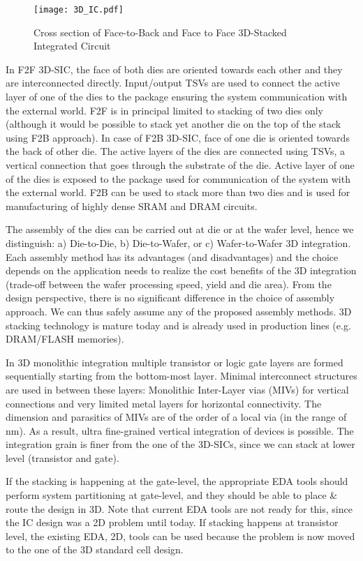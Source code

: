 \begin{figure}[!b]%
\centering
\texttt{[image: 3D\_IC.pdf]}
\caption{Cross section of Face-to-Back and Face to Face 3D-Stacked Integrated Circuit\label{fig:3D-Stacking}}
\end{figure}

In F2F 3D-SIC, the face of both dies are oriented towards each other and they are interconnected directly. Input/output TSVs are used to connect the active layer of one of the dies to the package ensuring the system communication with the external world. F2F is in principal limited to stacking of two dies only (although it would be possible to stack yet another die on the top of the stack using F2B approach). In case of F2B 3D-SIC, face of one die is oriented towards the back of other die. The active layers of the dies are connected using TSVs, a vertical connection that goes through the substrate of the die. Active layer of one of the dies is exposed to the package used for communication of the system with the external world. F2B can be used to stack more than two dies and is used for manufacturing of highly dense SRAM and DRAM circuits.

The assembly of the dies can be carried out at die or at the wafer level, hence we distinguish: a) Die-to-Die, b) Die-to-Wafer, or c) Wafer-to-Wafer 3D integration. Each assembly method has its advantages (and disadvantages) and the choice depends on the application needs to realize the cost benefits of the 3D integration (trade-off between the wafer processing speed, yield and die area). From the design perspective, there is no significant difference in the choice of assembly approach. We can thus safely assume any of the proposed assembly methods. 3D stacking technology is mature today and is already used in production lines (e.g. DRAM/FLASH memories).

In 3D monolithic integration multiple transistor or logic gate layers are formed sequentially starting from the bottom-most layer. Minimal interconnect structures are used in between these layers: Monolithic Inter-Layer vias (MIVs) for vertical connections and very limited metal layers for horizontal connectivity. The dimension and parasitics of MIVs are of the order of a local via (in the range of nm). As a result, ultra fine-grained vertical integration of devices is possible. The integration grain is finer from the one of the 3D-SICs, since we can stack at lower level (transistor and gate). 

If the stacking is happening at the gate-level, the appropriate EDA tools should perform system partitioning at gate-level, and they should be able to place \& route the design in 3D. Note that current EDA tools are not ready for this, since the IC design was a 2D problem until today. If stacking happens at transistor level, the existing EDA, 2D, tools can be used because the problem is now moved to the one of the 3D standard cell design.  

